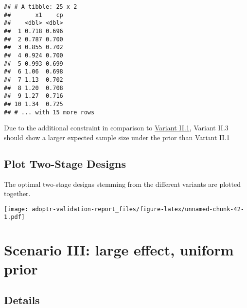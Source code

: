 \documentclass[]{book}
\newenvironment{Shaded}{\begin{snugshade}}{\end{snugshade}}
\newcommand{\DecValTok}[1]{\textcolor[rgb]{0.00,0.00,0.81}{#1}}
\newcommand{\KeywordTok}[1]{\textcolor[rgb]{0.13,0.29,0.53}{\textbf{#1}}}
\newcommand{\NormalTok}[1]{#1}
\newcommand{\OperatorTok}[1]{\textcolor[rgb]{0.81,0.36,0.00}{\textbf{#1}}}
\newcommand{\StringTok}[1]{\textcolor[rgb]{0.31,0.60,0.02}{#1}}
\begin{document}
\begin{verbatim}
## # A tibble: 25 x 2
##       x1    cp
##    <dbl> <dbl>
##  1 0.718 0.696
##  2 0.787 0.700
##  3 0.855 0.702
##  4 0.924 0.700
##  5 0.993 0.699
##  6 1.06  0.698
##  7 1.13  0.702
##  8 1.20  0.708
##  9 1.27  0.716
## 10 1.34  0.725
## # ... with 15 more rows
\end{verbatim}

Due to the additional constraint in comparison to \protect\hyperlink{variantII_1}{Variant II.1},
Variant II.3 should show a larger expected sample size under the prior than
Variant II.1

\begin{Shaded}
\end{Shaded}

\hypertarget{plot-two-stage-designs-1}{%
\section{Plot Two-Stage Designs}\label{plot-two-stage-designs-1}}

The optimal two-stage designs stemming from the different variants
are plotted together.

\texttt{[image: adoptr-validation-report\_files/figure-latex/unnamed-chunk-42-1.pdf]}

\hypertarget{scenarioIII}{%
\chapter{Scenario III: large effect, uniform prior}\label{scenarioIII}}

\hypertarget{details-2}{%
\section{Details}\label{details-2}}
\end{document}
